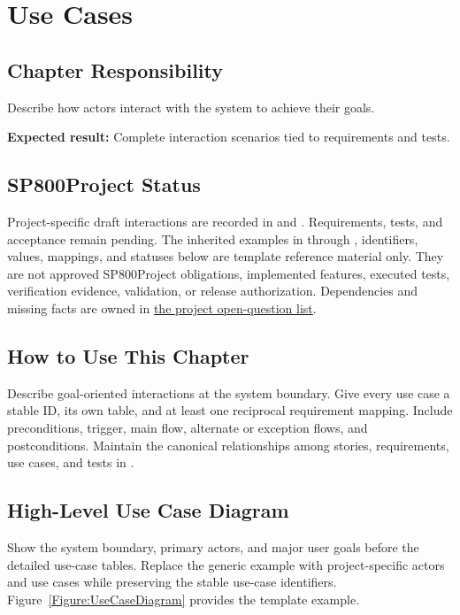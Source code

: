 \chapter{Use Cases}
\section{Chapter Responsibility}
\label{Section:UseCasesResponsibility}
Describe how actors interact with the system to achieve their goals.

\noindent\textbf{Expected result:} Complete interaction scenarios tied to requirements and tests.

\section{SP800Project Status}
\label{Section:SP800StatusUseCases}
Project-specific draft interactions are recorded in  and
. Requirements, tests, and acceptance remain pending.
The inherited examples in  through ,
identifiers, values, mappings, and statuses below are template reference
material only. They are not approved SP800Project obligations, implemented features,
executed tests, verification evidence, validation, or release authorization.
Dependencies and missing facts are owned in
\hyperref[Section:SP800OpenQuestions]{the project open-question list}.

\section{How to Use This Chapter}
Describe goal-oriented interactions at the system boundary. Give every use case
a stable ID, its own table, and at least one reciprocal requirement mapping.
Include preconditions, trigger, main flow, alternate or exception flows, and
postconditions. Maintain the canonical relationships among stories,
requirements, use cases, and tests in .

\section[High-Level Use Case Diagram]{\hspace{0.5em}High-Level Use Case Diagram}
Show the system boundary, primary actors, and major user goals before the
detailed use-case tables. Replace the generic example with project-specific
actors and use cases while preserving the stable use-case identifiers.
Figure~\ref{Figure:UseCaseDiagram} provides the template example.

